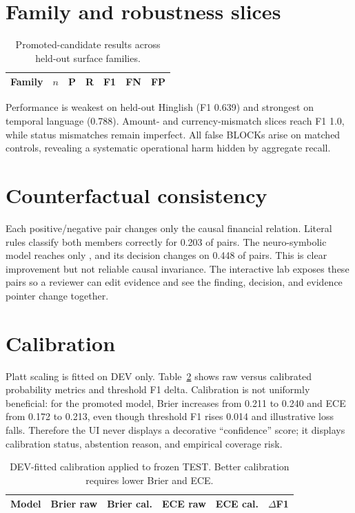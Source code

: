 \documentclass[10pt,twocolumn]{article}
\begin{document}
\section{Family and robustness slices}
\begin{table}[t]
\centering\small
\begin{tabular}{lrrrrrr}
\toprule
Family & $n$ & P & R & F1 & FN & FP\\
\midrule

\end{tabular}
\caption{Promoted-candidate results across held-out surface families.}
\label{tab:slices}
\end{table}
Performance is weakest on held-out Hinglish (F1 0.639) and strongest on temporal language (0.788). Amount- and currency-mismatch slices reach F1 1.0, while status mismatches remain imperfect. All \NeuroFalseBlock{} false BLOCKs arise on matched controls, revealing a systematic operational harm hidden by aggregate recall.

\section{Counterfactual consistency}
Each positive/negative pair changes only the causal financial relation. Literal rules classify both members correctly for 0.203 of pairs. The neuro-symbolic model reaches only \PairBothCorrect{}, and its decision changes on 0.448 of pairs. This is clear improvement but not reliable causal invariance. The interactive lab exposes these pairs so a reviewer can edit evidence and see the finding, decision, and evidence pointer change together.

\section{Calibration}
Platt scaling is fitted on DEV only. Table~\ref{tab:cal} shows raw versus calibrated probability metrics and threshold F1 delta. Calibration is not uniformly beneficial: for the promoted model, Brier increases from 0.211 to 0.240 and ECE from 0.172 to 0.213, even though threshold F1 rises 0.014 and illustrative loss falls. Therefore the UI never displays a decorative ``confidence'' score; it displays calibration status, abstention reason, and empirical coverage risk.

\begin{table}[t]
\centering\small
\begin{tabular}{lrrrrr}
\toprule
Model & Brier raw & Brier cal. & ECE raw & ECE cal. & $\Delta$F1\\
\midrule

\end{tabular}
\caption{DEV-fitted calibration applied to frozen TEST. Better calibration requires lower Brier and ECE.}
\label{tab:cal}
\end{table}
\end{document}
